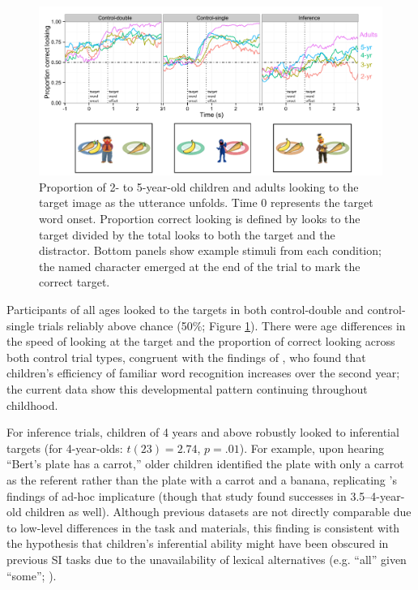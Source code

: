 \documentclass[10pt,letterpaper]{article}
\begin{document}
\begin{figure}[t]
\begin{center} 
  \includegraphics[width=.8\textwidth]{figures/expt1-accuracy.pdf}
  \caption{\label{fig:age} Proportion of 2- to 5-year-old children and adults looking to the target image as the utterance unfolds. Time 0 represents the target word onset. Proportion correct looking is defined by looks to the target divided by the total looks to both the target and the distractor. Bottom panels show example stimuli from each condition; the named character emerged at the end of the trial to mark the correct target.}
  \end{center} 
\end{figure}


Participants of all ages looked to the targets in both control-double and control-single trials reliably above chance (50\%; Figure \ref{fig:age}). There were age differences in the speed of looking at the target and the proportion of correct looking across both control trial types, congruent with the findings of , who found that children's efficiency of familiar word recognition increases over the second year; the current data show this developmental pattern continuing throughout childhood. 

For inference trials, children of 4 years and above robustly looked to inferential targets (for 4-year-olds: $t(23) = 2.74$, $p =.01$). For example, upon hearing ``Bert's plate has a carrot,'' older children identified the plate with only a carrot as the referent rather than the plate with a carrot and a banana, replicating 's findings of ad-hoc implicature (though that study found successes in 3.5--4-year-old children as well). Although previous datasets are not directly comparable due to low-level differences in the task and materials, this finding is consistent with the hypothesis that children's inferential ability might have been obscured in previous SI tasks due to the unavailability of lexical alternatives (e.g. ``all'' given ``some''; ).
\end{document}
